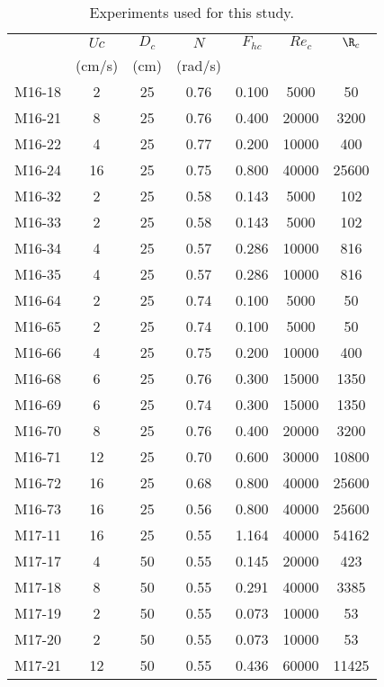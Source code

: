 
\begin{table}
\caption{\label{table:exp} Experiments used for this study.}
\begin{tabular}{lcccccc}
    &   $Uc$ &  $D_c$ &  $N$  &  $F_{hc}$ &  $Re_c$ &   $\R_c$  \\
    & (cm/s) &   (cm) &(rad/s)&           &         &           \\

 M16-18 &   2 &  25 &  0.76 &  0.100 &   5000 &     50 \\
 M16-21 &   8 &  25 &  0.76 &  0.400 &  20000 &   3200 \\
 M16-22 &   4 &  25 &  0.77 &  0.200 &  10000 &    400 \\
 M16-24 &  16 &  25 &  0.75 &  0.800 &  40000 &  25600 \\
 M16-32 &   2 &  25 &  0.58 &  0.143 &   5000 &    102 \\
 M16-33 &   2 &  25 &  0.58 &  0.143 &   5000 &    102 \\
 M16-34 &   4 &  25 &  0.57 &  0.286 &  10000 &    816 \\
 M16-35 &   4 &  25 &  0.57 &  0.286 &  10000 &    816 \\
 M16-64 &   2 &  25 &  0.74 &  0.100 &   5000 &     50 \\
 M16-65 &   2 &  25 &  0.74 &  0.100 &   5000 &     50 \\
 M16-66 &   4 &  25 &  0.75 &  0.200 &  10000 &    400 \\
 M16-68 &   6 &  25 &  0.76 &  0.300 &  15000 &   1350 \\
 M16-69 &   6 &  25 &  0.74 &  0.300 &  15000 &   1350 \\
 M16-70 &   8 &  25 &  0.76 &  0.400 &  20000 &   3200 \\
 M16-71 &  12 &  25 &  0.70 &  0.600 &  30000 &  10800 \\
 M16-72 &  16 &  25 &  0.68 &  0.800 &  40000 &  25600 \\
 M16-73 &  16 &  25 &  0.56 &  0.800 &  40000 &  25600 \\
 M17-11 &  16 &  25 &  0.55 &  1.164 &  40000 &  54162 \\
 M17-17 &   4 &  50 &  0.55 &  0.145 &  20000 &    423 \\
 M17-18 &   8 &  50 &  0.55 &  0.291 &  40000 &   3385 \\
 M17-19 &   2 &  50 &  0.55 &  0.073 &  10000 &     53 \\
 M17-20 &   2 &  50 &  0.55 &  0.073 &  10000 &     53 \\
 M17-21 &  12 &  50 &  0.55 &  0.436 &  60000 &  11425 \\

\end{tabular}
\end{table}
